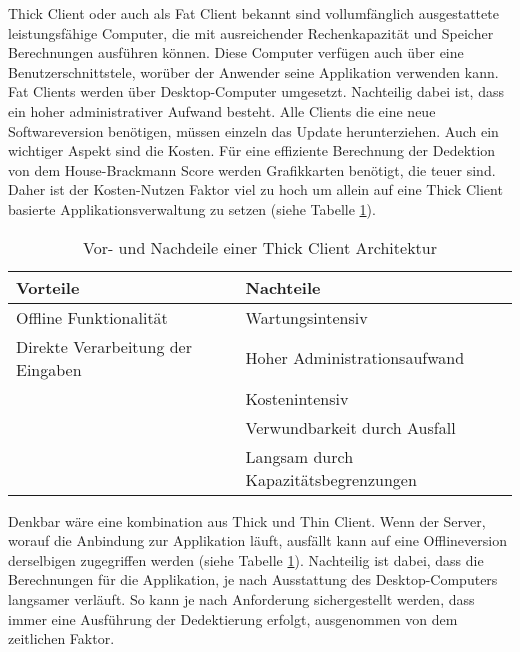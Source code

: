 \vspace{3ex}

Thick Client oder auch als Fat Client bekannt sind vollumfänglich ausgestattete leistungsfähige Computer, die mit ausreichender Rechenkapazität und Speicher Berechnungen ausführen können. Diese Computer verfügen auch über eine Benutzerschnittstele, worüber der Anwender seine Applikation verwenden kann. Fat Clients werden über Desktop-Computer umgesetzt. Nachteilig dabei ist, dass ein hoher administrativer Aufwand besteht. Alle Clients die eine neue Softwareversion benötigen, müssen einzeln das Update herunterziehen. Auch ein wichtiger Aspekt sind die Kosten. Für eine effiziente Berechnung der Dedektion von dem House-Brackmann Score werden Grafikkarten benötigt, die teuer sind. Daher ist der Kosten-Nutzen Faktor viel zu hoch um allein auf eine Thick Client basierte Applikationsverwaltung zu setzen (siehe Tabelle \ref{cap:thickclient}).

\begin{table}[h]\vspace{1ex}\centering
  \begin{tabular*}{14cm}{l|l}
  \textbf{Vorteile} & \textbf{Nachteile}
  \\\hline
  Offline Funktionalität             &  Wartungsintensiv               \\
  Direkte Verarbeitung der Eingaben  &  Hoher Administrationsaufwand   \\
                                     &  Kostenintensiv                 \\
                                     &  Verwundbarkeit durch Ausfall   \\
                                     &  Langsam durch Kapazitätsbegrenzungen
  \\\hline
  \end{tabular*}
  \caption[Vor- und Nachteile von Thick Client]{Vor- und Nachdeile einer Thick Client Architektur}\label{cap:thickclient}
\vspace{2ex}\end{table}\label{table:thickclient}

Denkbar wäre eine kombination aus Thick und Thin Client. Wenn der Server, worauf die Anbindung zur Applikation läuft, ausfällt kann auf eine Offlineversion derselbigen zugegriffen werden (siehe Tabelle \ref{cap:thickclient}). Nachteilig ist dabei, dass die Berechnungen für die Applikation, je nach Ausstattung des Desktop-Computers langsamer verläuft. So kann je nach Anforderung sichergestellt werden, dass immer eine Ausführung der Dedektierung erfolgt, ausgenommen von dem zeitlichen Faktor.

